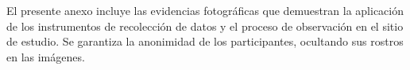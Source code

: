 
El presente anexo incluye las evidencias fotográficas que demuestran la aplicación de los instrumentos de recolección de datos y el proceso de observación en el sitio de estudio. Se garantiza la anonimidad de los participantes, ocultando sus rostros en las imágenes.


\lipsum[30-31]